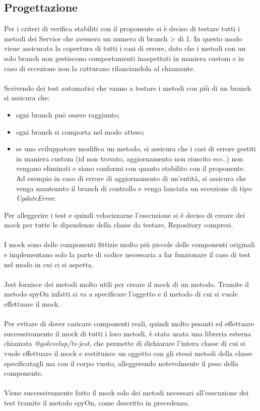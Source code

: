 \subsection{Progettazione}
Per i criteri di verifica stabiliti con il proponente si è deciso di testare tutti i metodi dei Service che
avessero un numero di branch > di 1. In questo modo viene assicurata la copertura di tutti i casi di errore,
dato che i metodi con un solo branch 
non gestiscono comportamenti inaspettati in maniera custom e in caso di eccezione non la catturano 
rilanciandola al chiamante.
\\\\
Scrivendo dei test automatici che vanno a testare i metodi con più di un branch si assicura che:
\begin{itemize}
    \item ogni branch può essere raggiunto;
    \item ogni branch si comporta nel modo atteso;
    \item se uno sviluppatore modifica un metodo, si assicura che i casi di errore gestiti in maniera custom (id non trovato, 
    aggiornamento non riuscito ecc..) non vengano eliminati e siano conformi con quanto stabilito con il proponente. 
    \\
    Ad esempio in caso di errore di aggiornamento di un'entità, si assicura che venga mantenuto il branch di controllo e
    venga lanciata un eccezione di tipo \textit{UpdateError}.
\end{itemize}
\leavevmode\newline
Per alleggerire i test e quindi velocizzarne l'esecuzione si è deciso di creare dei \gls{mock} per tutte le dipendenze
della classe da testare, Repository compresi.
\\\\
I \gls{mock} sono delle componenti fittizie molto più piccole delle componenti originali e implementano solo la parte di codice 
necessaria a far funzionare il caso di test nel modo in cui ci si aspetta.
\\\\
Jest fornisce dei metodi molto utili per creare il \gls{mock} di un metodo.
Tramite il metodo spyOn infatti si va a specificare l'oggetto e il metodo di cui si vuole effettuare il \gls{mock}.
\\\\
Per evitare di dover caricare componenti reali, quindi molto pesanti ed effettuare successivamente il \gls{mock} di tutti i loro metodi, è stata
usata una libreria esterna chiamata \textit{@golevelup/ts-jest}, che permette di dichiarare l'intera classe di cui si vuole effettuare
il \gls{mock} e restituisce un oggetto con gli stessi metodi della classe specificatagli ma con il corpo vuoto, 
alleggerendo notevolmente il peso della componente.
\\\\
Viene successivamente fatto il \gls{mock} solo dei metodi necessari all'esecuzione dei test tramite il metodo
spyOn, come descritto in precedenza.
\clearpage
